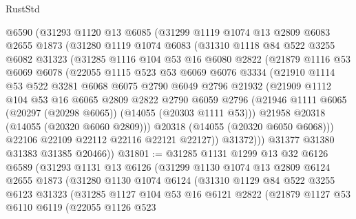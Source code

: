 \begin{lexlean}{RustStd}
\begin{coremodule}
    @6590
    (@31293
      @1120
      @13
      @6085
      (@31299
        @1119
        @1074
        @13
        @2809
        @6083
        @2655
        @1873
        (@31280
          @1119
          @1074
          @6083
          (@31310
            @1118
            @84
            @522
            @3255
            @6082
            @31323
            (@31285
              @1116
              @104
              @53
              @16
              @6080
              @2822
              (@21879
                @1116
                @53
                @6069
                @6078
                (@22055
                  @1115
                  @523
                  @53
                  @6069
                  @6076
                  @3334
                  (@21910
                    @1114
                    @53
                    @522
                    @3281
                    @6068
                    @6075
                    @2790
                    @6049
                    @2796
                    @21932
                    (@21909
                      @1112
                      @104
                      @53
                      @16
                      @6065
                      @2809
                      @2822
                      @2790
                      @6059
                      @2796
                      (@21946 @1111 @6065 (@20297 (@20298 @6065)) (@14055 (@20303 @1111 @53)))
                      @21958
                      @20318
                      (@14055 (@20320 @6060 @2809)))
                    @20318
                    (@14055 (@20320 @6050 @6068)))
                  @22106
                  @22109
                  @22112
                  @22116
                  @22121
                  @22127))
              @31372)))
        @31377
        @31380
        @31383
        @31385
        @20466))
@31801 := @31285
    @1131
    @1299
    @13
    @32
    @6126
    @6589
    (@31293
      @1131
      @13
      @6126
      (@31299
        @1130
        @1074
        @13
        @2809
        @6124
        @2655
        @1873
        (@31280
          @1130
          @1074
          @6124
          (@31310
            @1129
            @84
            @522
            @3255
            @6123
            @31323
            (@31285
              @1127
              @104
              @53
              @16
              @6121
              @2822
              (@21879
                @1127
                @53
                @6110
                @6119
                (@22055
                  @1126
                  @523

\end{coremodule}
\end{lexlean}
